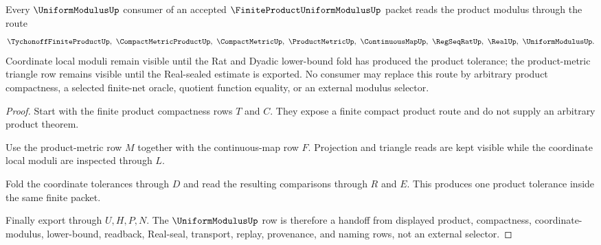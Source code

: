 \begin{theorem}
\label{thm:finite-product-uniform-modulus-export}
Every $\UniformModulusUp$ consumer of an accepted $\FiniteProductUniformModulusUp$ packet reads the product modulus through the route
$$
\TychonoffFiniteProductUp,\ \CompactMetricProductUp,\ \CompactMetricUp,\ \ProductMetricUp,\ \ContinuousMapUp,\ \RegSeqRatUp,\ \RealUp,\ \UniformModulusUp .
$$
Coordinate local moduli remain visible until the Rat and Dyadic lower-bound fold has produced the product tolerance; the product-metric triangle row remains visible until the Real-sealed estimate is exported. No consumer may replace this route by arbitrary product compactness, a selected finite-net oracle, quotient function equality, or an external modulus selector.
\end{theorem}
\begin{proof}
Start with the finite product compactness rows $T$ and $C$. They expose a finite compact product route and do not supply an arbitrary product theorem.

Use the product-metric row $M$ together with the continuous-map row $F$. Projection and triangle reads are kept visible while the coordinate local moduli are inspected through $L$.

Fold the coordinate tolerances through $D$ and read the resulting comparisons through $R$ and $E$. This produces one product tolerance inside the same finite packet.

Finally export through $U,H,P,N$. The $\UniformModulusUp$ row is therefore a handoff from displayed product, compactness, coordinate-modulus, lower-bound, readback, Real-seal, transport, replay, provenance, and naming rows, not an external selector.
\end{proof}


